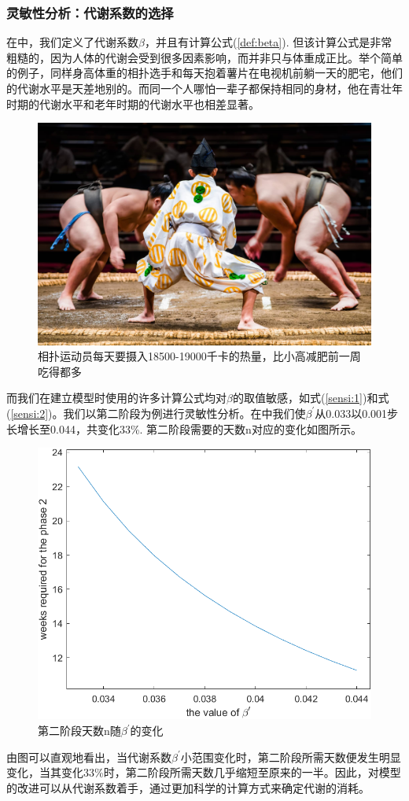 \documentclass[a4paper,12pt,onecolumn,twoside]{article}
\begin{document}
\subsubsection{灵敏性分析：代谢系数的选择}\label{choosebeta}
在中，我们定义了代谢系数$\beta$，并且有计算公式(\ref{def:beta}). 但该计算公式是非常粗糙的，因为人体的代谢会受到很多因素影响，而并非只与体重成正比。举个简单的例子，同样身高体重的相扑选手和每天抱着薯片在电视机前躺一天的肥宅，他们的代谢水平是天差地别的。而同一个人哪怕一辈子都保持相同的身材，他在青壮年时期的代谢水平和老年时期的代谢水平也相差显著。
\begin{figure}[H]
	\centering
	\includegraphics[width=0.8\linewidth]{res/sumo.jpg}
	\caption{相扑运动员每天要摄入18500-19000千卡的热量，比小高减肥前一周吃得都多\protect\footnotemark}
\end{figure}
而我们在建立模型时使用的许多计算公式均对$\beta$的取值敏感，如式(\ref{sensi:1})和式(\ref{sensi:2})。我们以第二阶段为例进行灵敏性分析。在中我们使$\beta^{\prime}$从0.033以0.001步长增长至0.044，共变化33\%. 第二阶段需要的天数n对应的变化如图所示。
\begin{figure}[H]
	\centering
	\includegraphics[width=0.7\linewidth]{res/sensitivity.png}
	\caption{第二阶段天数n随$\beta^{\prime}$的变化}
\end{figure}
由图可以直观地看出，当代谢系数$\beta^{\prime}$小范围变化时，第二阶段所需天数便发生明显变化，当其变化33\%时，第二阶段所需天数几乎缩短至原来的一半。因此，对模型的改进可以从代谢系数着手，通过更加科学的计算方式来确定代谢的消耗。
\end{document}
